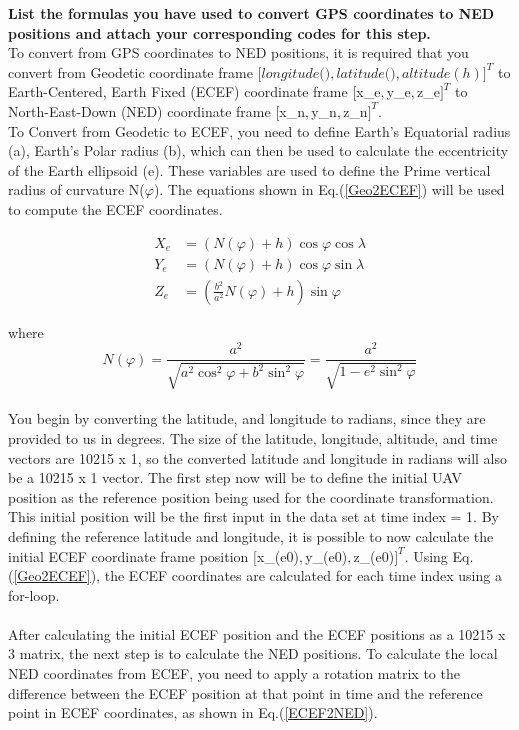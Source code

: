 \textbf{List the formulas you have used to convert GPS coordinates to NED positions and attach your corresponding codes for this step.}\\

To convert from GPS coordinates to NED positions, it is required that you convert from Geodetic coordinate frame $ [longitude ($\lambda$), latitude ($\phi$), altitude (h)]^T$ to Earth-Centered, Earth Fixed (ECEF) coordinate frame $[$x_e$, $y_e$, $z_e$]^T$ to North-East-Down (NED) coordinate frame $[$x_n$, $y_n$, $z_n$]^T$. \\
To Convert from Geodetic to ECEF, you need to define Earth's Equatorial radius (a), Earth's Polar radius (b), which can then be used to calculate the eccentricity of the Earth ellipsoid (e). These variables are used to define the Prime vertical radius of curvature N($\varphi$). The equations shown in Eq.(\ref{Geo2ECEF}) will be used to compute the ECEF coordinates.

\begin{equation}
\begin{aligned}
X_e &= \left(N(\varphi) + h\right) \cos \varphi \cos \lambda\\
Y_e &= \left(N(\varphi) + h\right) \cos \varphi \sin \lambda\\
Z_e &= \left(\frac{b^2}{a^2} N(\varphi) + h \right) \sin \varphi
\end{aligned}
\label{Geo2ECEF}
\end{equation}

where
\begin{equation}
N(\varphi) = \frac{a^2}{\sqrt{a^2 \cos^2 \varphi + b^2 \sin^2 \varphi}} = \frac{a^2}{\sqrt{1 - e^2 \sin^2 \varphi}}
\label{N_phi}
\end{equation} \\

You begin by converting the latitude, and longitude to radians, since they are provided to us in degrees. The size of the latitude, longitude, altitude, and time vectors are 10215 x 1, so the converted latitude and longitude in radians will also be a 10215 x 1 vector. The first step now will be to define the initial UAV position as the reference position being used for the coordinate transformation. This initial position will be the first input in the data set at time index = 1. By defining the reference latitude and longitude, it is possible to now calculate the initial ECEF coordinate frame position $[$x_(e0)$, $y_(e0)$, $z_(e0)$]^T$. Using Eq.(\ref{Geo2ECEF}), the ECEF coordinates are calculated for each time index using a for-loop.
\\
\\
After calculating the initial ECEF position and the ECEF positions as a 10215 x 3 matrix, the next step is to calculate the NED positions. To calculate the local NED coordinates from ECEF, you need to apply a rotation matrix to the difference between the ECEF position at that point in time and the reference point in ECEF coordinates, as shown in Eq.(\ref{ECEF2NED}).

